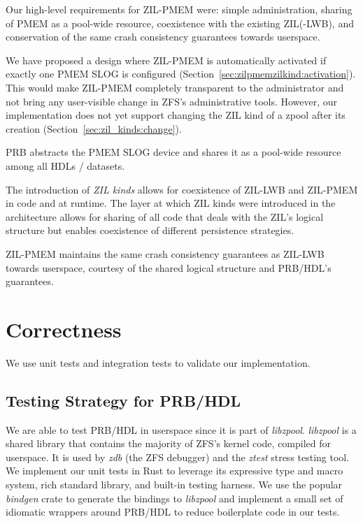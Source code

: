 \documentclass[12pt,a4paper,twoside]{book}
\begin{document}
{Our high-level requirements for ZIL-PMEM were: simple administration, sharing of PMEM as a pool-wide resource, coexistence with the existing ZIL(-LWB), and conservation of the same crash consistency guarantees towards userspace.
\begin{description}[noitemsep]
    \item[Simple Administration] We have proposed a design where ZIL-PMEM is automatically activated if exactly one PMEM SLOG is configured (Section~\ref{sec:zilpmemzilkind:activation}).
        This would make ZIL-PMEM completely transparent to the administrator and not bring any user-visible change in ZFS's administrative tools.
        However, our implementation does not yet support changing the ZIL kind of a zpool after its creation (Section~\ref{sec:zil_kinds:change}).
    \item[Pooled Storage] PRB abstracts the PMEM SLOG device and shares it as a pool-wide resource among all HDLs / datasets.
    \item[Coexistence] The introduction of \textit{ZIL kinds} allows for coexistence of ZIL-LWB and ZIL-PMEM in code and at runtime.
        The layer at which ZIL kinds were introduced in the architecture allows for sharing of all code that deals with the ZIL's logical structure but enables coexistence of different persistence strategies.
    \item[Same Guarantees] ZIL-PMEM maintains the same crash consistency guarantees as ZIL-LWB towards userspace, courtesy of the shared logical structure and PRB/HDL's guarantees.
\end{description}

\section{Correctness}

We use unit tests and integration tests to validate our implementation.

\subsection{Testing Strategy for PRB/HDL}\label{sec:eval:correctness:prb}

We are able to test PRB/HDL in userspace since it is part of \textit{libzpool}.
\textit{libzpool} is a shared library that contains the majority of ZFS's kernel code, compiled for userspace.
It is used by \textit{zdb} (the ZFS debugger) and the \textit{ztest} stress testing tool.
We implement our unit tests in Rust to leverage its expressive type and macro system, rich standard library, and built-in testing harness.
We use the popular \textit{bindgen} crate to generate the bindings to \textit{libzpool} and implement a small set of idiomatic wrappers around PRB/HDL to reduce boilerplate code in our tests.

}
\end{document}
